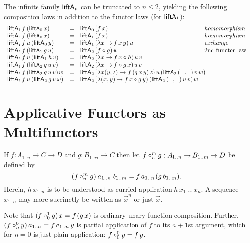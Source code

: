 {The infinite family $\liftA[n]$ can be truncated to $n \leq 2$,
yielding the following composition laws in addition to the functor
laws (for $\liftA[1]$):
\[
\begin{array}{lll@{\quad}l}
  \liftA[1]\,f\,(\liftA[0]\,x) & = & \liftA[0]\,(f\,x) & \mbox{\ulaw{homomorphism}} \\
  \liftA[2]\,f\,(\liftA[0]\,x) & = & \liftA[1]\,(f\,x) & \mbox{\ulaw{homomorphism}} \\
  \liftA[2]\,f\,u\,(\liftA[0]\,y) & = & \liftA[1]\,(\lambda x \to f\,x\,y)\,u
    & \mbox{\ulaw{exchange}} \\
  \liftA[2]\,f\,(\liftA[1]\,g\,u) & = & \liftA[2]\,(f \circ g)\,u
    & \mbox{2nd functor law} \\
  \liftA[2]\,f\,u\,(\liftA[1]\,h\,v) & = & \liftA[2]\,(\lambda x \to f\,x \circ h)\,u\,v \\
  \liftA[1]\,f\,(\liftA[2]\,g\,u\,v) & = & \liftA[2]\,(\lambda x \to f \circ g\,x)\,u\,v \\
  \liftA[2]\,f\,(\liftA[2]\,g\,u\,v)\,w & = &
    \multicolumn 2 l {
    \liftA[2]\,(\lambda x (y,z) \to f\,(g\,x\,y)\,z)\,u\,(\liftA[2]\,(\_{,}\_)\,v\,w)
    } \\
  \liftA[2]\,f\,u\,(\liftA[2]\,g\,v\,w) & = &
    \liftA[2]\,(\lambda (x,y) \to f\,x \circ g\,y)\,(\liftA[2]\,(\_{,}\_)\,u\,v)\,w
    \\
\end{array}
\]

\section{Applicative Functors as Multifunctors}

If $f : A_{1..n} \to C \to D$ and $g : B_{1..m} \to C$ then let
$f \compose[m]n g : A_{1..n} \to B_{1..m} \to D$ be
defined by
\[
  (f \compose[m]n g)\;a_{1..n}\;b_{1..m} = f\,a_{1..n}\,(g\,b_{1..m})
  .
\]
Herein, $h\,x_{1..n}$ is to be understood as curried application
$h\,x_1\,\dots\,x_n$.  A sequence $x_{1..n}$ may more succinctly be
written as $\vec x^n$ or just $\vec x$.

Note that $(f \compose[1]0 g)\,x = f\,(g\,x)$ is ordinary unary function composition.
Further, $(f \compose[0]n y)\,a_{1..n} = f\,a_{1..n}\,y$ is partial application of $f$ to its $n+1$st argument, which for $n=0$ is just plain application: $f \compose[0]0 y = f\,y$.

}
